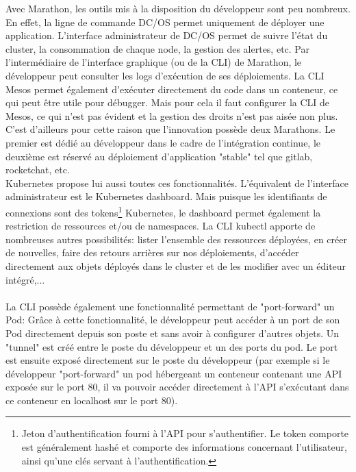 \documentclass[11pt,fleqn]{book} %
\begin{document}
Avec Marathon, les outils mis à la disposition du développeur sont peu nombreux. En effet, la ligne de commande DC/OS permet uniquement de déployer une application. L'interface administrateur de DC/OS permet de suivre l'état du cluster, la consommation de chaque node, la gestion des alertes, etc. Par l'intermédiaire de l'interface graphique (ou de la CLI) de Marathon, le développeur peut consulter les logs d'exécution de ses déploiements. La CLI Mesos permet également d'exécuter directement du code dans un conteneur, ce qui peut être utile pour débugger. Mais pour cela il faut configurer la CLI de Mesos, ce qui n'est pas évident et la gestion des droits n'est pas aisée non plus. C'est d'ailleurs pour cette raison que l'innovation possède deux Marathons. Le premier est dédié au développeur dans le cadre de l'intégration continue, le deuxième est réservé au déploiement d'application "stable" tel que gitlab, rocketchat, etc. \\

Kubernetes propose lui aussi toutes ces fonctionnalités. L'équivalent de l'interface administrateur est le Kubernetes dashboard. Mais puisque les identifiants de connexions sont des tokens\footnote{Jeton d'authentification fourni à l'API pour s'authentifier. Le token comporte est généralement hashé et comporte des informations concernant l'utilisateur, ainsi qu'une clés servant à l'authentification.} Kubernetes, le dashboard permet également la restriction de ressources et/ou de namespaces. La CLI kubectl apporte de nombreuses autres possibilités: lister l'ensemble des ressources déployées, en créer de nouvelles, faire des retours arrières sur nos déploiements, d'accéder directement aux objets déployés dans le cluster et de les modifier avec un éditeur intégré,...\\ \\

La CLI possède également une fonctionnalité permettant de "port-forward" un Pod: Grâce à cette fonctionnalité, le développeur peut accéder à un port de son Pod directement depuis son poste et sans avoir à configurer d'autres objets. Un "tunnel" est créé entre le poste du développeur et un des ports du pod. Le port est ensuite exposé directement sur le poste du développeur (par exemple si le développeur "port-forward" un pod hébergeant un conteneur contenant une API exposée sur le port 80, il va pouvoir accéder directement à l'API s'exécutant dans ce conteneur en localhost sur le port 80). \\
\end{document}

